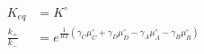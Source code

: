\begin{eqnarray}\label{eqn:equilibrium-constant}
K_{eq} & = K^\circ \\
\frac{k_+}{k_-} &  = e^{\frac{1}{RT}\left(\gamma_C\mu_C^\circ+ \gamma_D\mu_D^\circ -\gamma_A\mu_A^\circ-\gamma_B\mu_B^\circ\right)} \\
\end{eqnarray}